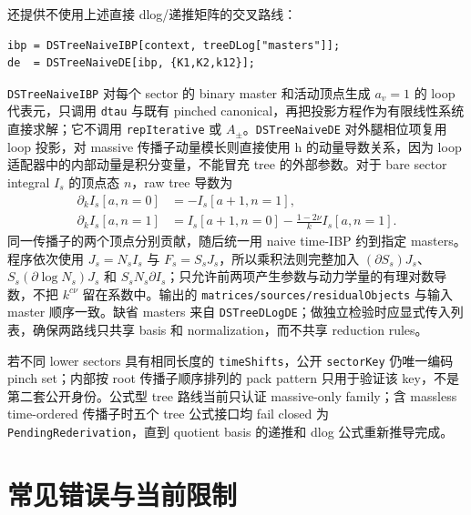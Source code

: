 ﻿\documentclass[a4paper,11pt]{article}
\begin{document}
还提供不使用上述直接 dlog/递推矩阵的交叉路线：
\begin{verbatim}
ibp = DSTreeNaiveIBP[context, treeDLog["masters"]];
de  = DSTreeNaiveDE[ibp, {K1,K2,k12}];
\end{verbatim}
\texttt{DSTreeNaiveIBP} 对每个 sector 的 binary master 和活动顶点生成 $a_v=1$ 的 loop 代表元，只调用 \texttt{dtau} 与既有 pinched canonical，再把投影方程作为有限线性系统直接求解；它不调用 \texttt{repIterative} 或 $A_\pm$。\texttt{DSTreeNaiveDE} 对外腿相位项复用 loop 投影，对 massive 传播子动量模长则直接使用 h 的动量导数关系，因为 loop 适配器中的内部动量是积分变量，不能冒充 tree 的外部参数。对于 bare sector integral $I_s$ 的顶点态 $n$，raw tree 导数为
\begin{align}
 \partial_k I_s[a,n=0]&=-I_s[a+1,n=1],\\
 \partial_k I_s[a,n=1]&=I_s[a+1,n=0]-\frac{1-2\nu}{k}I_s[a,n=1].
\end{align}
同一传播子的两个顶点分别贡献，随后统一用 naive time-IBP 约到指定 masters。程序依次使用 $J_s=N_sI_s$ 与 $F_s=S_sJ_s$，所以乘积法则完整加入 $(\partial S_s)J_s$、$S_s(\partial\log N_s)J_s$ 和 $S_sN_s\partial I_s$；只允许前两项产生参数与动力学量的有理对数导数，不把 $k^{c\nu}$ 留在系数中。输出的 \texttt{matrices/sources/residualObjects} 与输入 master 顺序一致。缺省 masters 来自 \texttt{DSTreeDLogDE}；做独立检验时应显式传入列表，确保两路线只共享 basis 和 normalization，而不共享 reduction rules。

若不同 lower sectors 具有相同长度的 \texttt{timeShifts}，公开 \texttt{sectorKey} 仍唯一编码 pinch set；内部按 root 传播子顺序排列的 pack pattern 只用于验证该 key，不是第二套公开身份。公式型 tree 路线当前只认证 massive-only family；含 massless time-ordered 传播子时五个 tree 公式接口均 fail closed 为 \texttt{PendingRederivation}，直到 quotient basis 的递推和 dlog 公式重新推导完成。

\section{常见错误与当前限制}
\end{document}
